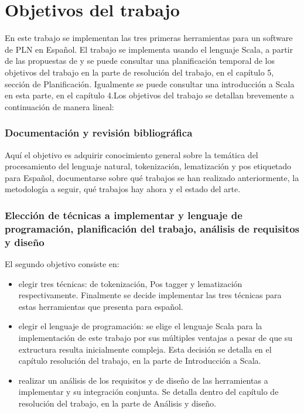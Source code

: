 
\chapter{Objetivos del trabajo}
En este trabajo se implementan las tres primeras herramientas para un software de PLN en Español. El trabajo se implementa usando el lenguaje \textcolor{SchoolColor}{Scala}, a partir de las propuestas de \citet{smedt2012pattern} y se puede consultar una planificación temporal de los objetivos del trabajo en la parte de \textsf{resolución del trabajo}, en el capítulo 5, sección de Planificación. Igualmente se puede consultar una introducción a \textcolor{SchoolColor}{Scala} en esta parte, en el capítulo 4.\newline Los objetivos del trabajo se detallan brevemente a continuación de manera lineal: 
\subsection*{Documentación y revisión bibliográfica}
Aquí el objetivo es adquirir conocimiento general sobre la temática del procesamiento del lenguaje natural, tokenización, lematización y pos etiquetado para Español, documentarse sobre qué trabajos se han realizado anteriormente, la metodología a seguir, qué trabajos hay ahora y el estado del arte. 
\subsection*{Elección de técnicas a implementar y lenguaje de programación, planificación del trabajo, análisis de requisitos y diseño}
El segundo objetivo consiste en:
\begin{itemize}
\item elegir tres técnicas: de tokenización, Pos tagger y lematización respectivamente. Finalmente se decide implementar las tres técnicas para estas herramientas que presenta \citet{smedt2012pattern} para español.
\item elegir el lenguaje de programación: se elige el lenguaje Scala para la implementación de este trabajo por sus múltiples ventajas a pesar de que su extructura resulta inicialmente compleja. Esta decisión se detalla en el capítulo resolución del trabajo, en la parte de Introducción a Scala.
\item realizar un análisis de los requisitos y de diseño de las herramientas a implementar y su integración conjunta. Se detalla dentro del capítulo de resolución del trabajo, en la parte de Análisis y diseño.
\end{itemize}

